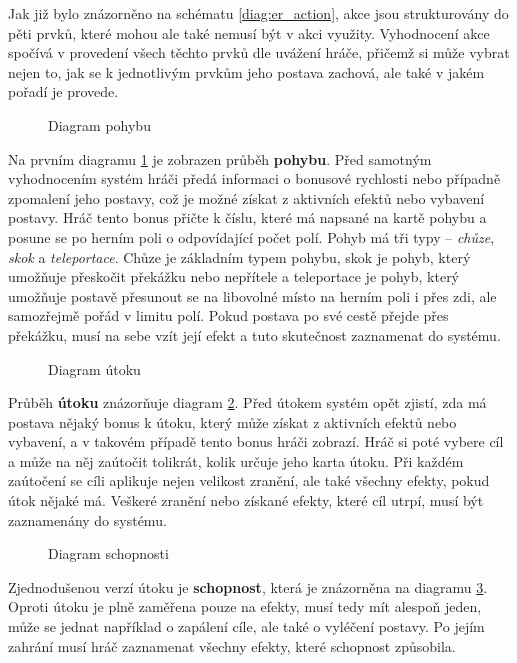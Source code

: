 Jak již bylo znázorněno na schématu \ref{diag:er_action}, akce jsou strukturovány do pěti prvků, které mohou ale také nemusí být v akci využity. Vyhodnocení akce spočívá v provedení všech těchto prvků dle uvážení hráče, přičemž si může vybrat nejen to, jak se k jednotlivým prvkům jeho postava zachová, ale také v jakém pořadí je provede.

\begin{figure}[h]
    \centering
    \caption{Diagram pohybu}
    \label{diag:movement}
\end{figure}

Na prvním diagramu \ref{diag:movement} je zobrazen průběh \textbf{pohybu}. Před samotným vyhodnocením systém hráči předá informaci o bonusové rychlosti nebo případně zpomalení jeho postavy, což je možné získat z aktivních efektů nebo vybavení postavy. Hráč tento bonus přičte k číslu, které má napsané na kartě pohybu a posune se po herním poli o odpovídající počet polí. Pohyb má tři typy -- \textit{chůze}, \textit{skok} a \textit{teleportace}. Chůze je základním typem pohybu, skok je pohyb, který umožňuje přeskočit překážku nebo nepřítele a teleportace je pohyb, který umožňuje postavě přesunout se na libovolné místo na herním poli i přes zdi, ale samozřejmě pořád v limitu polí. Pokud postava po své cestě přejde přes překážku, musí na sebe vzít její efekt a tuto skutečnost zaznamenat do systému.

\begin{figure}[h]
    \centering
    \caption{Diagram útoku}
    \label{diag:attack}
\end{figure}

Průběh \textbf{útoku} znázorňuje diagram \ref{diag:attack}. Před útokem systém opět zjistí, zda má postava nějaký bonus k útoku, který může získat z aktivních efektů nebo vybavení, a v takovém případě tento bonus hráči zobrazí. Hráč si poté vybere cíl a může na něj zaútočit tolikrát, kolik určuje jeho karta útoku. Při každém zaútočení se cíli aplikuje nejen velikost zranění, ale také všechny efekty, pokud útok nějaké má. Veškeré zranění nebo získané efekty, které cíl utrpí, musí být zaznamenány do systému.

\begin{figure}[h]
    \centering
    \caption{Diagram schopnosti}
    \label{diag:skill}
\end{figure}

Zjednodušenou verzí útoku je \textbf{schopnost}, která je znázorněna na diagramu \ref{diag:skill}. Oproti útoku je plně zaměřena pouze na efekty, musí tedy mít alespoň jeden, může se jednat například o zapálení cíle, ale také o vyléčení postavy. Po jejím zahrání musí hráč zaznamenat všechny efekty, které schopnost způsobila.

